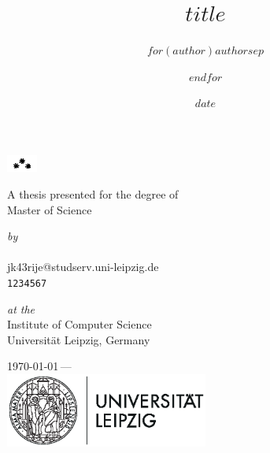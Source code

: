 \documentclass[11pt,a4paper]{book}
\date{$date$}
\newcommand{\gitrevision}{%
  \StrLeft{\HEAD}{7}%
}
\begin{document}
\author{$for(author)$$author$$sep$ \and $endfor$}
\title{$title$}

\makeatletter
{}
\begin{titlepage}
  \begin{center}
    \vspace*{2.5cm}
    
    {\huge\@title\unskip\strut\par}
    
    \vspace{8mm}

    \includegraphics[width=0.075\textwidth]{layout/asterism-ulysses.png}
    \vspace{3mm}

    A thesis presented for the degree of \\ \vspace{2mm}
    {\Large Master of Science}
    
    \vspace{5mm}

    \textit{by} \\ \vspace{2mm}
    {\Large \@author} \\ \vspace{1mm}
    jk43rije@studserv.uni-leipzig.de \\
    \texttt{1234567}
    
    \vspace{5mm}

    \textit{at the} \\ \vspace{1mm}
    Institute of Computer Science \\
    Universität Leipzig, Germany \\ \vspace{3mm}

    \today\,— \texttt{\gitrevision} \\

    \vspace{3mm}
    \includegraphics[width=0.5\textwidth]{layout/leipzig-university.eps}


\end{center}
\end{titlepage}
\end{document}

